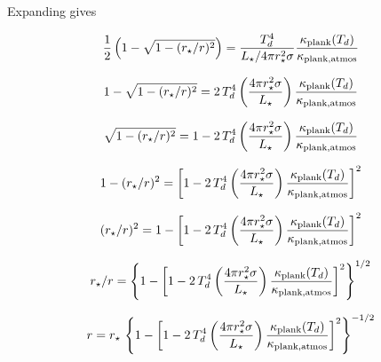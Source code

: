 \documentclass[11pt]{article}
\begin{document}
Expanding gives

$$
 \frac{1}{2}\left(1-\sqrt{1-(r_{\star}/r)^2}\right) = \frac{T_d^4}{L_\star/4\pi r_\star^2\sigma}\frac{\kappa_{\rm plank}(T_d)}{\kappa_{\rm plank, atmos}}
$$

$$
1-\sqrt{1-(r_{\star}/r)^2} = 2\,T_d^4\left(\frac{4\pi r_\star^2\sigma}{L_\star}\right)\frac{\kappa_{\rm plank}(T_d)}{\kappa_{\rm plank, atmos}}
$$

$$
\sqrt{1-(r_{\star}/r)^2} = 1-2\,T_d^4\left(\frac{4\pi r_\star^2\sigma}{L_\star}\right)\frac{\kappa_{\rm plank}(T_d)}{\kappa_{\rm plank, atmos}}
$$

$$
1-(r_{\star}/r)^2 = \left[1-2\,T_d^4\left(\frac{4\pi r_\star^2\sigma}{L_\star}\right)\frac{\kappa_{\rm plank}(T_d)}{\kappa_{\rm plank, atmos}}\right]^2
$$

$$
(r_{\star}/r)^2 = 1-\left[1-2\,T_d^4\left(\frac{4\pi r_\star^2\sigma}{L_\star}\right)\frac{\kappa_{\rm plank}(T_d)}{\kappa_{\rm plank, atmos}}\right]^2
$$

$$
r_{\star}/r = \left\{1-\left[1-2\,T_d^4\left(\frac{4\pi r_\star^2\sigma}{L_\star}\right)\frac{\kappa_{\rm plank}(T_d)}{\kappa_{\rm plank, atmos}}\right]^2\right\} ^ {1/2}
$$

$$
r = r_{\star} \,  \left\{1-\left[1-2\,T_d^4\left(\frac{4\pi r_\star^2\sigma}{L_\star}\right)\frac{\kappa_{\rm plank}(T_d)}{\kappa_{\rm plank, atmos}}\right]^2\right\} ^ {-1/2}
$$
\end{document}
